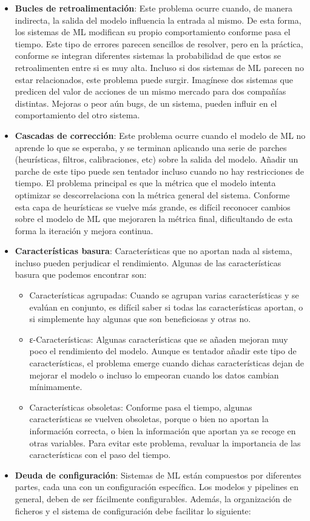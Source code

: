 \documentclass[
  12pt,
  a4paperpaper,
]{report}
\providecommand{\tightlist}{%
  \setlength{\itemsep}{0pt}\setlength{\parskip}{0pt}}
\begin{document}
\begin{itemize}
\item
  \textbf{Bucles de retroalimentación}: Este problema ocurre cuando, de
  manera indirecta, la salida del modelo influencia la entrada al mismo.
  De esta forma, los sistemas de ML modifican su propio comportamiento
  conforme pasa el tiempo. Este tipo de errores parecen sencillos de
  resolver, pero en la práctica, conforme se integran diferentes
  sistemas la probabilidad de que estos se retroalimenten entre si es
  muy alta. Incluso si dos sistemas de ML parecen no estar relacionados,
  este problema puede surgir. Imagínese dos sistemas que predicen del
  valor de acciones de un mismo mercado para dos compañías distintas.
  Mejoras o peor aún bugs, de un sistema, pueden influir en el
  comportamiento del otro sistema.
\item
  \textbf{Cascadas de corrección}: Este problema ocurre cuando el modelo
  de ML no aprende lo que se esperaba, y se terminan aplicando una serie
  de parches (heurísticas, filtros, calibraciones, etc) sobre la salida
  del modelo. Añadir un parche de este tipo puede sen tentador incluso
  cuando no hay restricciones de tiempo. El problema principal es que la
  métrica que el modelo intenta optimizar se descorrelaciona con la
  métrica general del sistema. Conforme esta capa de heurísticas se
  vuelve más grande, es difícil reconocer cambios sobre el modelo de ML
  que mejoraren la métrica final, dificultando de esta forma la
  iteración y mejora continua.
\item
  \textbf{Características basura}: Características que no aportan nada
  al sistema, incluso pueden perjudicar el rendimiento. Algunas de las
  características basura que podemos encontrar son:

  \begin{itemize}
  \tightlist
  \item
    Características agrupadas: Cuando se agrupan varias características
    y se evalúan en conjunto, es difícil saber si todas las
    características aportan, o si simplemente hay algunas que son
    beneficiosas y otras no.
  \item
    ε-Características: Algunas características que se añaden mejoran muy
    poco el rendimiento del modelo. Aunque es tentador añadir este tipo
    de características, el problema emerge cuando dichas características
    dejan de mejorar el modelo o incluso lo empeoran cuando los datos
    cambian mínimamente.
  \item
    Características obsoletas: Conforme pasa el tiempo, algunas
    características se vuelven obsoletas, porque o bien no aportan la
    información correcta, o bien la información que aportan ya se recoge
    en otras variables. Para evitar este problema, revaluar la
    importancia de las características con el paso del tiempo.
  \end{itemize}
\item
  \textbf{Deuda de configuración}: Sistemas de ML están compuestos por
  diferentes partes, cada una con un configuración específica. Los
  modelos y pipelines en general, deben de ser fácilmente configurables.
  Además, la organización de ficheros y el sistema de configuración debe
  facilitar lo siguiente:


\end{itemize}
\end{document}
